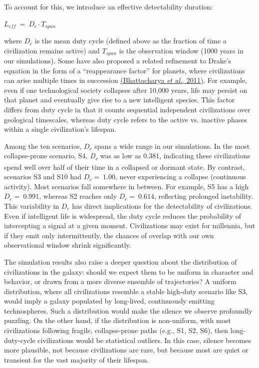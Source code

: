 To account for this, we introduce an effective detectability duration:

\(L_{eff}\  = \ D_{c} \cdot T_{span}\)

where \(D_{c}\) is the mean duty cycle (defined above as the fraction of time a civilization remains active) and \(T_{span}\) is the observation window (1000 years in our simulations). Some have also proposed a related refinement to Drake's equation in the form of a ``reappearance factor'' for planets, where civilizations can arise multiple times in succession \href{https://paperpile.com/c/hQuIW4/FH2j}{(Bhattacharya \emph{et al.}, 2011)}. For example, even if one technological society collapses after 10,000 years, life may persist on that planet and eventually give rise to a new intelligent species. This factor differs from duty cycle in that it counts sequential independent civilizations over geological timescales, whereas duty cycle refers to the active vs. inactive phases within a single civilization's lifespan.

Among the ten scenarios, \(D_{c}\) spans a wide range in our simulations. In the most collapse-prone scenario, S4, \emph{D\textsubscript{c}} was as low as 0.381, indicating these civilizations spend well over half of their time in a collapsed or dormant state. By contrast, scenarios S3 and S10 had \(D_{c} = \ 1.00\), never experiencing a collapse (continuous activity). Most scenarios fall somewhere in between. For example, S5 has a high \(D_{c} = \ 0.991\), whereas S2 reaches only \(D_{c} = \ 0.614\), reflecting prolonged instability. This variability in \(D_{c}\) has direct implications for the detectability of civilizations. Even if intelligent life is widespread, the duty cycle reduces the probability of intercepting a signal at a given moment. Civilizations may exist for millennia, but if they emit only intermittently, the chances of overlap with our own observational window shrink significantly.

The simulation results also raise a deeper question about the distribution of civilizations in the galaxy: should we expect them to be uniform in character and behavior, or drawn from a more diverse ensemble of trajectories? A uniform distribution, where all civilizations resemble a stable high-duty scenario like S3, would imply a galaxy populated by long-lived, continuously emitting technospheres. Such a distribution would make the silence we observe profoundly puzzling. On the other hand, if the distribution is non-uniform, with most civilizations following fragile, collapse-prone paths (e.g., S1, S2, S6), then long-duty-cycle civilizations would be statistical outliers. In this case, silence becomes more plausible, not because civilizations are rare, but because most are quiet or transient for the vast majority of their lifespan.

